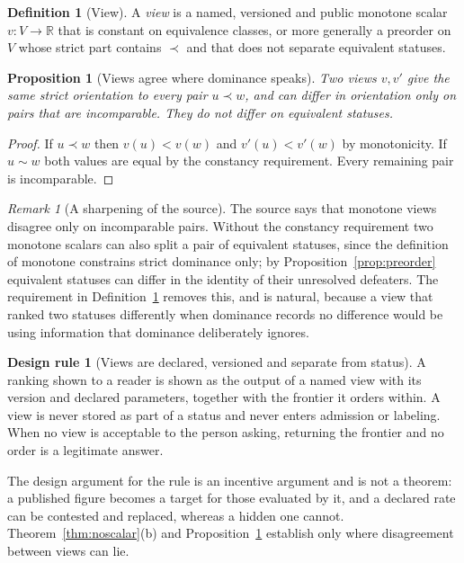 \documentclass[11pt]{article}
\theoremstyle{plain}
\newtheorem{proposition}[theorem]{Proposition}
\theoremstyle{definition}
\newtheorem{definition}[theorem]{Definition}
\newtheorem{designrule}[theorem]{Design rule}
\theoremstyle{remark}
\newtheorem{remark}[theorem]{Remark}
\newcommand{\R}{\mathbb R}
\begin{document}
\begin{definition}[View]\label{def:view}
A \emph{view} is a named, versioned and public monotone scalar $v:V\to\R$ that is constant on equivalence classes, or more generally a preorder on $V$ whose strict part contains $\prec$ and that does not separate equivalent statuses.
\end{definition}

\begin{proposition}[Views agree where dominance speaks]\label{prop:views}
Two views $v,v'$ give the same strict orientation to every pair $u\prec w$, and can differ in orientation only on pairs that are incomparable. They do not differ on equivalent statuses.
\end{proposition}

\begin{proof}
If $u\prec w$ then $v(u)<v(w)$ and $v'(u)<v'(w)$ by monotonicity. If $u\sim w$ both values are equal by the constancy requirement. Every remaining pair is incomparable.
\end{proof}

\begin{remark}[A sharpening of the source]
The source says that monotone views disagree only on incomparable pairs. Without the constancy requirement two monotone scalars can also split a pair of equivalent statuses, since the definition of monotone constrains strict dominance only; by Proposition~\ref{prop:preorder} equivalent statuses can differ in the identity of their unresolved defeaters. The requirement in Definition~\ref{def:view} removes this, and is natural, because a view that ranked two statuses differently when dominance records no difference would be using information that dominance deliberately ignores.
\end{remark}

\begin{designrule}[Views are declared, versioned and separate from status]\label{rule:views}
A ranking shown to a reader is shown as the output of a named view with its version and declared parameters, together with the frontier it orders within. A view is never stored as part of a status and never enters admission or labeling. When no view is acceptable to the person asking, returning the frontier and no order is a legitimate answer.
\end{designrule}

The design argument for the rule is an incentive argument and is not a theorem: a published figure becomes a target for those evaluated by it, and a declared rate can be contested and replaced, whereas a hidden one cannot. Theorem~\ref{thm:noscalar}(b) and Proposition~\ref{prop:views} establish only where disagreement between views can lie.
\end{document}
